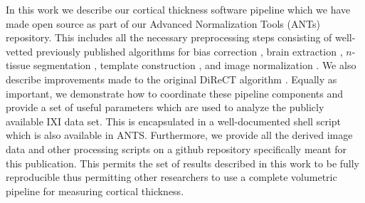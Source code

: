 In this work we describe our cortical thickness software pipeline which 
we have made open source as part of our Advanced Normalization Tools (ANTs) 
repository.  This includes all the necessary preprocessing steps consisting
of well-vetted previously published algorithms for bias correction \cite{tustison2010},
brain extraction \cite{avants2010a}, $n$-tissue segmentation \cite{avants2011a},
template construction \cite{avants2010}, and image normalization \cite{avants2011}.
We also describe improvements made to the original DiReCT algorithm \cite{das2009}.
Equally as important, we demonstrate how to coordinate
these pipeline components and provide a set of useful parameters
which are used to analyze the publicly available IXI data set. This is 
encapsulated in a well-documented shell script which is also available in ANTS. 
Furthermore, we provide all the derived image data and other processing scripts on 
a github repository specifically meant for this publication.  This permits
the set of results described in this work to be fully reproducible thus
permitting other researchers to use a complete volumetric pipeline for measuring
cortical thickness.













